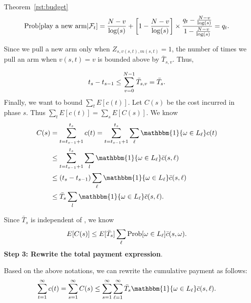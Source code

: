 \begin{extraproof}{Theorem~\ref{rst:budget}}
\begin{align}
\Prob{\text{play a new arm}|\mathcal{F}_{t}}=\frac{\ARMNUM-v}{\log(s)}+\left[1-\frac{\ARMNUM-v}{\log(s)}\right]\times \frac{q_t-\frac{\ARMNUM-v}{\log(s)}}{1-\frac{\ARMNUM-v}{\log(s)}}=q_t.
\end{align}

Since we pull a new arm only when $Z_{s,v(s,t),m(s,t)}=1$, the number of times we pull an arm when $v(s,t)=v$ is bounded above by $\bar{T}_{s,v}$. Thus,

\begin{align}
t_{s}-t_{s-1}\leq \sum_{v=0}^{N-1}\bar{T}_{s,v}=\bar{T}_{s}.
\end{align}
Finally, we want to bound $\sum_{t}E[c(t)]$. Let $C(s)$ be the cost incurred in phase $s$. Thus $\sum_{t}E[c(t)]=\sum_{s}E[C(s)]$. We know
\begin{align*}
C(s)&=\sum_{t=t_{s-1}+1}^{t_{s}}c(t)=\sum_{t=t_{s-1}+1}^{t_{s}}\sum_{\ell}\mathbbm{1}\{\SP\in \Env{\ell}\}c(t)  \\
&\leq \sum_{t=t_{s-1}+1}^{t_{s}}\sum_{l}\mathbbm{1}\{\SP\in \Env{\ell}\}\bar{c}(s,\ell)  \\
&\leq (t_{s}-t_{s-1})\sum_{\ell} \mathbbm{1}\{\SP\in \Env{\ell}\}\bar{c}(s,\ell)  \\
&\leq \bar{T}_{s}\sum_{l}\mathbbm{1}\{\SP\in \Env{\ell}\}\bar{c}(s,\ell). 
\end{align*}

Since $\bar{T}_{s}$ is independent of \SP, we know
\begin{align*}
E[C(s)]\leq E[\bar{T}_{s}]\sum_{\ell}\Prob{\SP\in \Env{\ell}}\bar{c}(s,\SP). 
\end{align*}
\noindent\textbf{Step 3: Rewrite the total payment expression}.

Based on the above notations, we can rewrite the cumulative payment as follows:
\begin{align*}
\sum_{t=1}^{\infty}c(t) =\sum_{s=1}^{\infty}C(s)
\leq  \sum_{s=1}^{\infty}\sum_{\ell=1}^{\infty}\bar{T}_{s}\mathbbm{1}\{\SP\in \Env{\ell}\}\bar{c}(s,\ell). 
\end{align*}


\end{extraproof}
